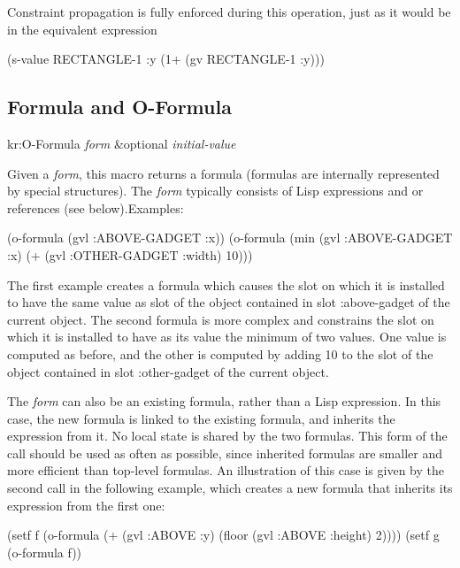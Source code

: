 Constraint propagation is fully enforced during this operation, just as it
would be in the equivalent expression
\begin{programexample}
(s-value RECTANGLE-1 :y (1+ (gv RECTANGLE-1 :y)))
\end{programexample}


\subsection{Formula and O-Formula}
\label{formula-and-o-formula}

\value{f-top}
\begin{example}
kr:O-Formula {\it form} \&optional {\it initial-value}\value{macro}
\end{example}

Given a {\it form}, this macro returns a formula (formulas are internally
represented by special structures).  The {\it form} typically consists of Lisp
expressions and  or  references (see below).\newline{}Examples:
\begin{programexample}
(o-formula (gvl :ABOVE-GADGET :x))
(o-formula (min (gvl :ABOVE-GADGET :x)
                (+ (gvl :OTHER-GADGET :width) 10)))
\end{programexample}
The first example creates a formula which
causes the slot on which it is installed to have the same value as slot
 of the object contained in slot {\sc :above-gadget} of the current
object.  The second formula is more complex and constrains the slot on
which it is installed to have as its value the minimum of two values.  One
value is computed as before, and the other is computed by adding 10 to the
 slot of the object contained in slot {\sc :other-gadget} of the
current object.

The {\it form} can also be an existing formula, rather than a Lisp
expression.  In this case, the new formula is linked to the
existing formula, and inherits the expression from it.  No local state is
shared by the two formulas.  This form of the call should be used as often
as possible, since inherited formulas are smaller and more efficient than
top-level formulas.
An illustration of this case is given by the
second call in the following example, which creates a new formula
that inherits its expression from the first one:
\begin{programexample}
(setf f (o-formula (+ (gvl :ABOVE :y)
                      (floor (gvl :ABOVE :height) 2))))
(setf g (o-formula f))
\end{programexample}

